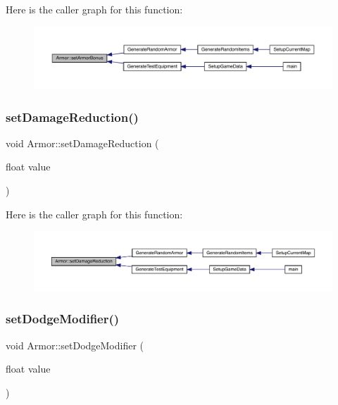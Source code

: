 Here is the caller graph for this function\+:
\nopagebreak
\begin{figure}[H]
\begin{center}
\leavevmode
\includegraphics[width=350pt]{class_armor_a14c15f72741f2a3dec28c746b3678c20_icgraph}
\end{center}
\end{figure}
\mbox{\label{class_armor_a08f926ae8438bae04058c22b098c6fcf}} 
\subsubsection{\texorpdfstring{set\+Damage\+Reduction()}{setDamageReduction()}}
{\footnotesize\ttfamily void Armor\+::set\+Damage\+Reduction (\begin{DoxyParamCaption}\item[{float}]{value }\end{DoxyParamCaption})}

Here is the caller graph for this function\+:
\nopagebreak
\begin{figure}[H]
\begin{center}
\leavevmode
\includegraphics[width=350pt]{class_armor_a08f926ae8438bae04058c22b098c6fcf_icgraph}
\end{center}
\end{figure}
\mbox{\label{class_armor_ab48309e3f16d226d56af617c65350698}} 
\subsubsection{\texorpdfstring{set\+Dodge\+Modifier()}{setDodgeModifier()}}
{\footnotesize\ttfamily void Armor\+::set\+Dodge\+Modifier (\begin{DoxyParamCaption}\item[{float}]{value }\end{DoxyParamCaption})}


